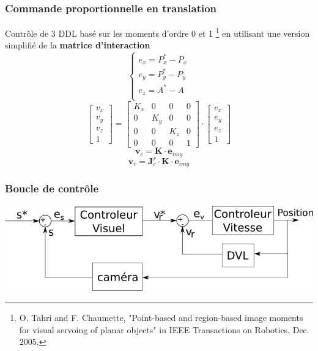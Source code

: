 \documentclass[10pt]{beamer}
\begin{document}
\begin{frame}
\frametitle{Commande proportionnelle en translation}
Contrôle de 3 DDL basé sur les moments d'ordre 0 et 1 \footnote{O. Tahri and F. Chaumette, "Point-based and region-based image moments for visual servoing of planar objects" in IEEE Transactions on Robotics, Dec. 2005.} en utilisant une version simplifié de la \textbf{matrice d'interaction}
\begin{equation*}
\begin{cases}
e_x = P_x^{*} - P_x \\
e_y = P_y^{*} - P_y \\
e_z = A^{*} - A \\
\end{cases}
\end{equation*}
\begin{equation*}
\begin{bmatrix}
v_x \\ v_y \\ v_z \\ 1
\end{bmatrix}
=
\begin{bmatrix}
K_x & 0 & 0 & 0\\ 0 & K_y & 0 & 0\\ 0 & 0 & K_z & 0 \\ 0 & 0 & 0 & 1
\end{bmatrix}
\cdot
\begin{bmatrix}
e_x \\ e_y \\ e_z \\ 1
\end{bmatrix}
\end{equation*}
\begin{equation*}
\mathbf{v}_c
= \mathbf{K} \cdot
\mathbf{e}_{img}
\end{equation*}
\begin{equation*}
\mathbf{v}_r
= \mathbf{J}^{r}_c \cdot \mathbf{K} \cdot
\mathbf{e}_{img}
\end{equation*}
\end{frame}

\begin{frame}
\centering
\frametitle{Boucle de contrôle}
\includegraphics[width=\textwidth]{Pictures/ControlScheme.png}
\end{frame}
\end{document}
